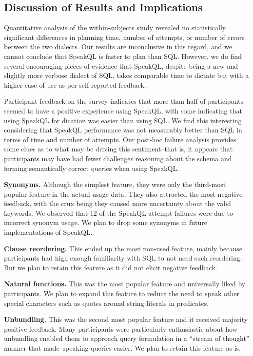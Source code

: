 \subsection{Discussion of Results and Implications}

Quantitative analysis of the within-subjects study revealed no statistically significant differences in planning time, number of attempts, or number of errors between the two dialects. Our results are inconclusive in this regard, and we cannot conclude that SpeakQL is faster to plan than SQL. However, we do find several encouraging pieces of evidence that SpeakQL, despite being a new and slightly more verbose dialect of SQL, takes comparable time to dictate but with a higher ease of use as per self-reported feedback. 

Participant feedback on the survey indicates that more than half of participants seemed to have a positive experience using SpeakQL, with some indicating that using SpeakQL for dication was easier than using SQL. We find this interesting considering that SpeakQL performance was not measurably better than SQL in terms of time and number of attempts. Our post-hoc failure analysis provides some clues as to what may be driving this sentiment--that is, it appears that participants may have had fewer challenges reasoning about the schema and forming semantically correct queries when using SpeakQL.


\textbf{Synonyms.} Although the simplest feature, they were only the third-most popular feature in the actual usage data. They also attracted the most negative feedback, with the crux being they caused more uncertainty about the valid keywords. We observed that 12 of the SpeakQL attempt failures were due to incorrect synonym usage. We plan to drop some synonyms in future implementations of SpeakQL. 

\textbf{Clause reordering.} This ended up the most non-used feature, mainly because participants had high enough familiarity with SQL to not need such reordering. But we plan to retain this feature as it did not elicit negative feedback.

\textbf{Natural functions.} This was the most popular feature and universally liked by participants. We plan to expand this feature to reduce the need to speak other special characters such as quotes around string literals in predicates.

\textbf{Unbundling.} This was the second most popular feature and it received majority positive feedback. Many participants were particularly enthusiastic about how unbundling enabled them to approach query formulation in a ``stream of thought'' manner that made speaking queries easier. We plan to retain this feature as is.

